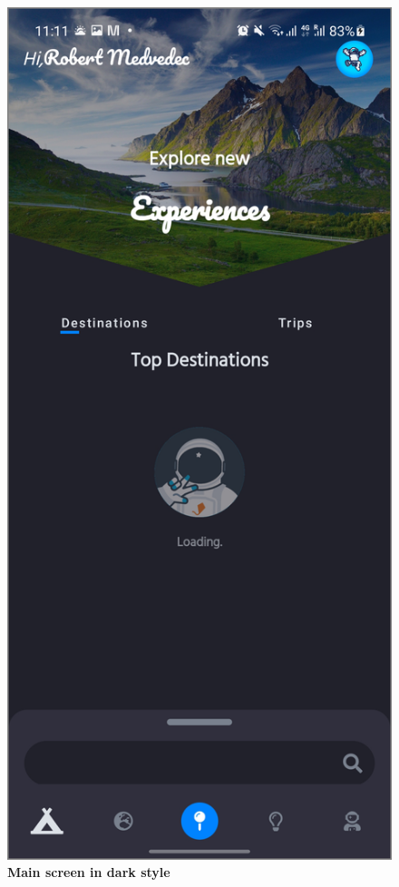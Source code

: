 \begin{figure}[!htb]
\begin{minipage}{.48\textwidth}
\end{minipage} 
\begin{minipage}{.48\textwidth}
\centering
\includegraphics[width=.9\textwidth]{../Images/UI/MainDark.jpg}
\caption{\label{fig:dbapiuser}\textbf{Main screen in dark style}}
\end{minipage}
\end{figure} 

